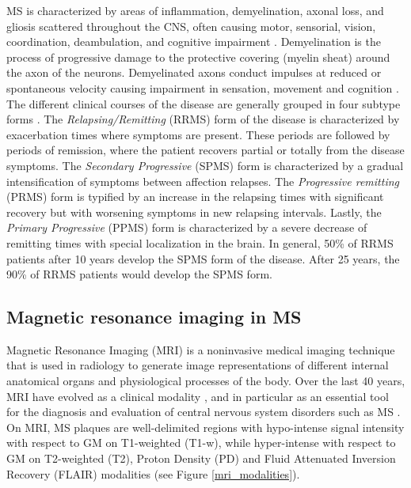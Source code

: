 MS is characterized by areas of inflammation, demyelination, axonal loss, and gliosis scattered throughout the CNS, often causing motor, sensorial, vision, coordination, deambulation, and cognitive impairment \cite{Compston2002}. Demyelination is the process of progressive damage to the protective covering (myelin sheat) around the axon of the neurons. Demyelinated axons conduct impulses at reduced or spontaneous velocity causing impairment in sensation, movement and cognition \cite{Compston2008}. The different clinical courses of the disease are generally grouped in four subtype forms \cite{Lublin1996}. The  \textit{Relapsing/Remitting} (RRMS) form of the disease is characterized by exacerbation times where symptoms are present. These periods are followed by periods of remission, where the patient recovers partial or totally from the disease symptoms. The \textit{Secondary Progressive} (SPMS) form is characterized by a gradual intensification of symptoms between affection relapses. The \textit{Progressive remitting} (PRMS) form is typified by an increase in the relapsing times with significant recovery but with worsening symptoms in new relapsing intervals. Lastly, the \textit{Primary Progressive} (PPMS) form is characterized by a severe decrease of remitting times with special localization in the brain. In general, 50\% of RRMS patients after 10 years develop the SPMS form of the disease. After 25 years, the 90\% of RRMS patients would develop the SPMS form. 


\subsection{Magnetic resonance imaging in MS}
\label{subsec:introduction_magnetic_resonance_imaging}
Magnetic Resonance Imaging (MRI) is a noninvasive medical imaging technique that is used in radiology to generate image representations of different internal anatomical organs and physiological processes of the body. Over the last 40 years, MRI have evolved as a clinical modality \cite{Geva2006}, and in particular as an essential tool for the diagnosis and evaluation of central nervous system disorders such as MS \cite{Edelman1993}. On MRI, MS plaques are well-delimited regions with hypo-intense signal intensity with respect to GM on T1-weighted (T1-w), while hyper-intense with respect to GM on T2-weighted (T2), Proton Density (PD) and Fluid Attenuated Inversion Recovery (FLAIR) modalities (see Figure \ref{mri_modalities}).

